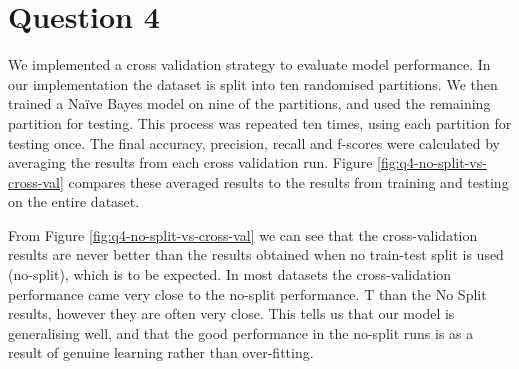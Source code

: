 \documentclass[11pt]{article}
\begin{document}
    \section*{Question 4}
    We implemented a cross validation strategy to evaluate model performance. In our implementation the dataset is split into ten randomised partitions. We then trained a Na\"{i}ve Bayes model on nine of the partitions, and used the remaining partition for testing. This process was repeated ten times, using each partition for testing once. The final accuracy, precision, recall and f-scores were calculated by averaging the results from each cross validation run. Figure \ref{fig:q4-no-split-vs-cross-val} compares these averaged results to the results from training and testing on the entire dataset.

    From Figure \ref{fig:q4-no-split-vs-cross-val} we can see that the cross-validation results are never better than the results obtained when no train-test split is used (no-split), which is to be expected. In most datasets the cross-validation performance came very close to the no-split performance. T than the No Split results, however they are often very close. This tells us that our model is generalising well, and that the good performance in the no-split runs is as a result of genuine learning rather than over-fitting. 
\end{document}
